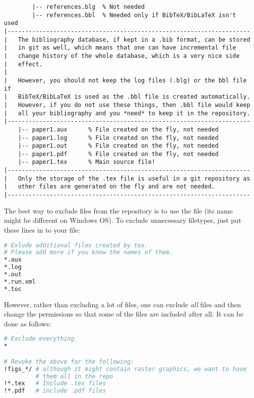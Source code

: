 \documentclass[
]{scrartcl}
\begin{document}
\begin{lstlisting}
        |-- references.blg  % Not needed
        |-- references.bbl  % Needed only if BibTeX/BibLaTeX isn't used
|---------------------------------------------------------------------
|   The bibliography database, if kept in a .bib format, can be stored
|   in git as well, which means that one can have incremental file
|   change history of the whole database, which is a very nice side
|   effect.
|
|   However, you should not keep the log files (.blg) or the bbl file if
|   BibTeX/BibLaTeX is used as the .bbl file is created automatically.
|   However, if you do not use these things, then .bbl file would keep
|   all your bibliography and you *need* to keep it in the repository.
|---------------------------------------------------------------------
    |-- paper1.aux      % File created on the fly, not needed
    |-- paper1.log      % File created on the fly, not needed
    |-- paper1.out      % File created on the fly, not needed
    |-- paper1.pdf      % File created on the fly, not needed
    |-- paper1.tex      % Main source file!
|---------------------------------------------------------------------
|   Only the storage of the .tex file is useful in a git repository as 
|   other files are generated on the fly and are not needed.
|---------------------------------------------------------------------
\end{lstlisting}

%
The best way to exclude files from the repository is to use the
     file (its name might be different on Windows OS).
%
To exclude unnecessary filetypes, just put these lines in to your
     file:

%
\begin{lstlisting}[language=Bash]
# Exlude additional files created by tex.
# Please add more if you know the names of them.
*.aux
*.log
*.out
*.run.xml
*.toc
\end{lstlisting}
%
However, rather than excluding a lot of files, one can exclude \emph{all} files
    and then change the permissions so that some of the files are included after
    all. It can be done as follows:
%
\begin{lstlisting}[language=Bash]
# Exclude everything
*

# Revoke the above for the following:
!figs_*/ # although it might contain raster graphics, we want to have
         # them all in the repo
!*.tex   # Include .tex files
!*.pdf   # include .pdf files
\end{lstlisting}
\end{document}
